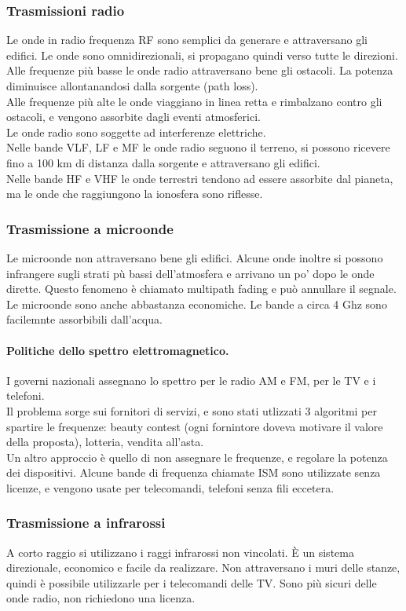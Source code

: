 \documentclass{article}
\begin{document}
		\subsubsection{Trasmissioni radio}
		Le onde in radio frequenza RF sono semplici da generare e attraversano gli edifici. Le onde sono omnidirezionali, si propagano quindi verso tutte le direzioni. \\
		Alle frequenze più basse le onde radio attraversano bene gli ostacoli. La potenza diminuisce allontanandosi dalla sorgente (path loss).\\
		Alle frequenze più alte le onde viaggiano in linea retta e rimbalzano contro gli ostacoli, e vengono assorbite dagli eventi atmosferici. \\
		Le onde radio sono soggette ad interferenze elettriche.\\
		Nelle bande VLF, LF e MF le onde radio seguono il terreno, si possono ricevere fino a 100 km di distanza dalla sorgente e attraversano gli edifici. \\
		Nelle bande HF e VHF le onde terrestri tendono ad essere assorbite dal pianeta, ma le onde che raggiungono la ionosfera sono riflesse. 
		\subsubsection{Trasmissione a microonde}
		Le microonde non attraversano bene gli edifici. Alcune onde inoltre si possono infrangere sugli strati pù bassi dell'atmosfera e arrivano un po' dopo le onde dirette. Questo fenomeno è chiamato multipath fading e può annullare il segnale. Le microonde sono anche abbastanza economiche. Le bande a circa 4 Ghz sono facilemnte assorbibili dall'acqua. 
		\paragraph{Politiche dello spettro elettromagnetico.} I governi nazionali assegnano lo spettro per le radio AM e FM, per le TV e i telefoni. \\ Il problema sorge sui fornitori di servizi, e sono stati utlizzati 3 algoritmi per spartire le frequenze: beauty contest (ogni fornintore doveva motivare il valore della proposta), lotteria, vendita all'asta. \\
		Un altro approccio è quello di non assegnare le frequenze, e regolare la potenza dei dispositivi. Alcune bande di frequenza chiamate ISM sono utilizzate senza licenze, e vengono usate per telecomandi, telefoni senza fili eccetera.
		\subsubsection{Trasmissione a infrarossi}
		A corto raggio si utilizzano i raggi infrarossi non vincolati. È un sistema direzionale, economico e facile da realizzare. Non attraversano i muri delle stanze, quindi è possibile utilizzarle per i telecomandi delle TV. Sono più sicuri delle onde radio, non richiedono una licenza.
\end{document}
